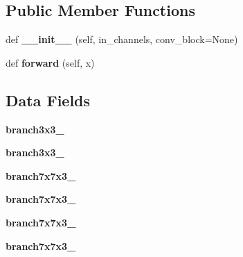 \subsection*{Public Member Functions}
\begin{DoxyCompactItemize}
\item 
\mbox{\label{classtorchvision_1_1models_1_1inception_1_1InceptionD_a5d30581b7eee9357c3524f8c39a05b87}} 
def {\bfseries \+\_\+\+\_\+init\+\_\+\+\_\+} (self, in\+\_\+channels, conv\+\_\+block=None)
\item 
\mbox{\label{classtorchvision_1_1models_1_1inception_1_1InceptionD_a3c942fbec9edcd8a22b54335ae9c974a}} 
def {\bfseries forward} (self, x)
\end{DoxyCompactItemize}
\subsection*{Data Fields}
\begin{DoxyCompactItemize}
\item 
\mbox{\label{classtorchvision_1_1models_1_1inception_1_1InceptionD_a3134621cbdecf52583676ec2a832ffb6}} 
{\bfseries branch3x3\+\_}
\item 
\mbox{\label{classtorchvision_1_1models_1_1inception_1_1InceptionD_a2f511d87229bd5f4ea18a5cf2b05c79e}} 
{\bfseries branch3x3\+\_}
\item 
\mbox{\label{classtorchvision_1_1models_1_1inception_1_1InceptionD_a68354739ee40609582f3c9b2ac654910}} 
{\bfseries branch7x7x3\+\_}
\item 
\mbox{\label{classtorchvision_1_1models_1_1inception_1_1InceptionD_a890a0c503e29e4dd610ad323e9aea8c2}} 
{\bfseries branch7x7x3\+\_}
\item 
\mbox{\label{classtorchvision_1_1models_1_1inception_1_1InceptionD_aea41c69fa0472378fb6d49af7ff3d5be}} 
{\bfseries branch7x7x3\+\_}
\item 
\mbox{\label{classtorchvision_1_1models_1_1inception_1_1InceptionD_a03997c27b41a1e1c5284e4f810aec0a3}} 
{\bfseries branch7x7x3\+\_}
\end{DoxyCompactItemize}


